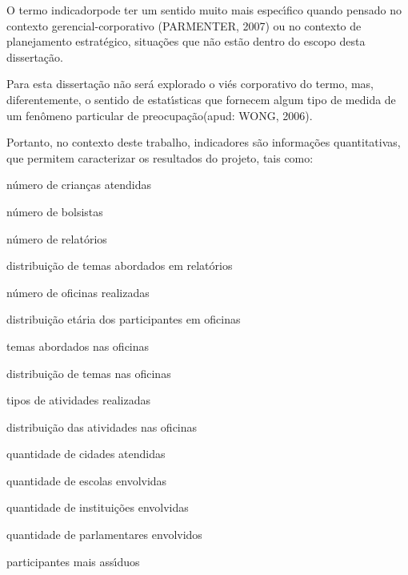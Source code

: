 \documentclass[
12pt,		%
openright,	%
twoside,  %
a4paper,			%
chapter=TITLE,		%
english,			%
french,				%
spanish,			%
brazil				%
]{USPSC-classe/USPSC}
\begin{document}
O termo \textquotedbl indicador\textquotedbl  pode ter um sentido muito mais espec\'{\i}fico quando pensado no contexto gerencial-corporativo (PARMENTER, 2007) ou no contexto de planejamento estrat\'egico, situa\c{c}\~oes que n\~ao est\~ao dentro do escopo desta disserta\c{c}\~ao.














Para esta disserta\c{c}\~ao n\~ao ser\'a explorado o vi\'es corporativo do termo, mas, diferentemente, o sentido de \textquotedbl estat\'{\i}sticas que fornecem algum tipo de medida de um fen\^omeno particular de preocupa\c{c}\~ao\textquotedbl  (apud: WONG, 2006).














Portanto, no contexto deste trabalho, indicadores s\~ao informa\c{c}\~oes quantitativas, que permitem caracterizar os resultados do projeto, tais como:















\begin{alineas}
\item n\'umero de crian\c{c}as atendidas
\item n\'umero de bolsistas
\item n\'umero de relat\'orios
\item distribui\c{c}\~ao de temas abordados em relat\'orios
\item n\'umero de oficinas realizadas
\item distribui\c{c}\~ao et\'aria dos participantes em oficinas
\item temas abordados nas oficinas
\item distribui\c{c}\~ao de temas nas oficinas
\item tipos de atividades realizadas
\item distribui\c{c}\~ao das atividades nas oficinas
\item quantidade de cidades atendidas
\item quantidade de escolas envolvidas
\item quantidade de institui\c{c}\~oes envolvidas
\item quantidade de parlamentares envolvidos
\item participantes mais ass\'{\i}duos
\end{alineas}
\end{document}
